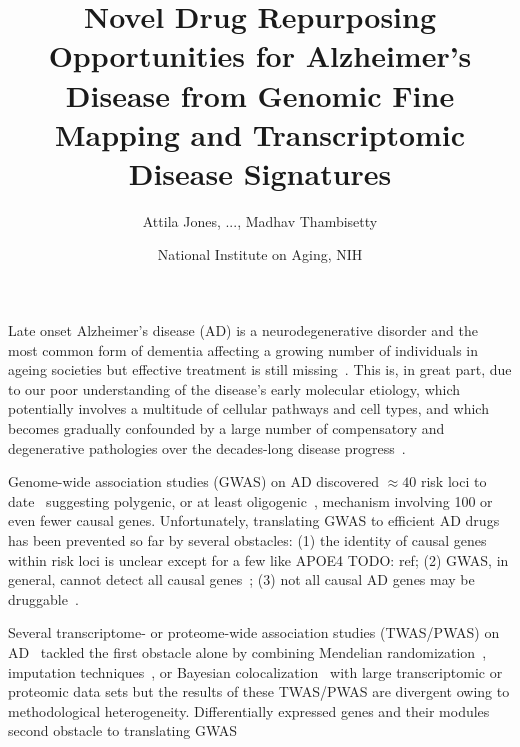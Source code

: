 \documentclass[letterpaper]{article}
\title{Novel Drug Repurposing Opportunities for Alzheimer's Disease from
  Genomic Fine Mapping and Transcriptomic Disease Signatures}
\author{Attila Jones, ..., Madhav Thambisetty}
\date{National Institute on Aging, NIH}
\begin{document}
\maketitle

Late onset Alzheimer's disease (AD) is a neurodegenerative disorder and the most
common form of dementia affecting a growing number of individuals in ageing
societies but effective treatment is still
missing~\citep{Bondi2017,Masters2015}.  This is, in great part,
due to our poor understanding of the disease's early molecular etiology,
which potentially involves a multitude of cellular pathways and cell types,
and which becomes gradually confounded by a large number of compensatory
and degenerative pathologies over the decades-long disease
progress~\citep{DeStrooper2016}.

Genome-wide association studies (GWAS) on AD discovered $\approx 40$ risk loci
to date~\citep{Jansen2019,Kunkle2019,Schwartzentruber2021,Wightman2021}
suggesting polygenic, or at least oligogenic~\citep{Zhang2020}, mechanism
involving 100 or even fewer causal genes.  Unfortunately, translating GWAS to
efficient AD drugs has been prevented so far by several obstacles: (1) the
identity of causal genes within risk loci is unclear except for a few like
APOE4 TODO: ref; (2) GWAS, in general, cannot detect all causal
genes~\citep{Cao2014}; (3) not all causal AD genes may be
druggable~\citep{Floris2018,Finan2017}.

Several transcriptome- or
proteome-wide association studies (TWAS/PWAS) on
AD~\citep{Jansen2019,Kunkle2019,Gerring2020,Baird2021,Schwartzentruber2021,Wingo2021}
tackled the first obstacle alone by combining Mendelian
randomization~\citep{DaveySmith2014,Lawlor2008}, imputation
techniques~\citep{Barbeira2018}, or Bayesian colocalization~\citep{Wen2017}
with large transcriptomic or proteomic data sets but the results of
these TWAS/PWAS are divergent owing to methodological heterogeneity.
Differentially expressed genes and their modules
second obstacle to translating GWAS


\end{document}
